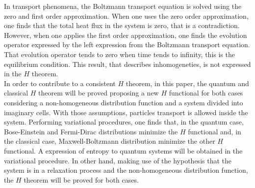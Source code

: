 \documentclass{article}
\begin{document}
In transport phenomena, the Boltzmann transport equation is solved using the zero and first order approximation. When one uses the zero order approximation, one finds that the total heat flux in the system is zero, that is a contradiction. However, when one applies the first order approximation, one finds the evolution operator expressed by the left expression from the Boltzmann transport equation. That evolution operator tends to zero when time tends to infinity, this is the equilibrium condition\cite{reif}. This result, that describes inhomogeneties, is not expressed in the $H$ theorem.\\
In order to contribute to a consistent $H$ theorem, in this paper, the quantum and classical $H$ theorem will be proved proposing a new $H$ functional for both cases considering a non-homogeneous distribution function and a system divided into imaginary cells. With those assumptions, particles transport is allowed inside the system. Performing variational procedures, one finds that, in the quantum case, Bose-Einstein and Fermi-Dirac distributions minimize the $H$ functional and, in the classical case, Maxwell-Boltzmann distribution minimize the other $H$ functional. A expression of entropy to quantum systems will be obtained in the variational procedure. In other hand, making use of the hypothesis that the system is in a relaxation process and the non-homogeneous distribution function, the $H$ theorem will be proved for both cases.
\end{document}
